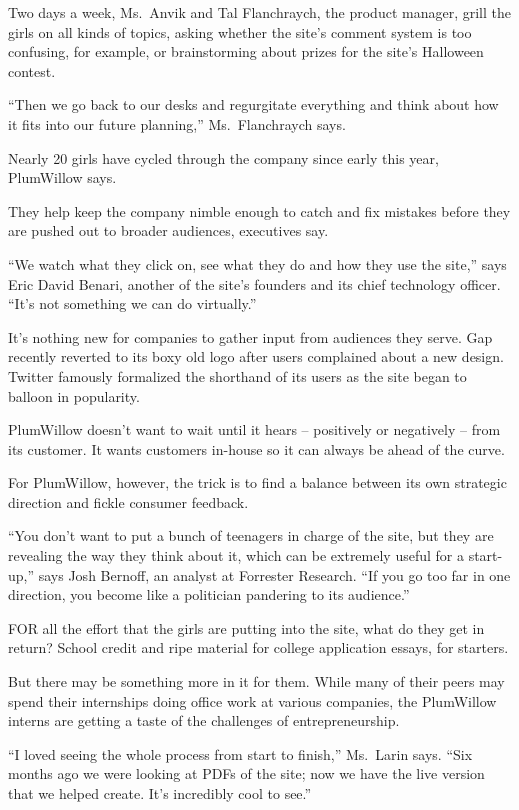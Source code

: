 ﻿\documentclass[12pt]{article}
\begin{document}
Two days a week, Ms.~Anvik and Tal Flanchraych, the product manager, grill the girls on all kinds of
topics, asking whether the site's comment system is too confusing, for example, or brainstorming
about prizes for the site's Halloween contest.

``Then we go back to our desks and regurgitate everything and think about how it fits into our
future planning,'' Ms.~Flanchraych says.

Nearly 20 girls have cycled through the company since early this year, PlumWillow says.

They help keep the company nimble enough to catch and fix mistakes before they are pushed out to
broader audiences, executives say.

``We watch what they click on, see what they do and how they use the site,'' says Eric David Benari,
another of the site's founders and its chief technology officer. ``It's not something we can do
virtually.''

It's nothing new for companies to gather input from audiences they serve. Gap recently reverted to
its boxy old logo after users complained about a new design. Twitter famously formalized the
shorthand of its users as the site began to balloon in popularity.

PlumWillow doesn't want to wait until it hears -- positively or negatively -- from its customer. It
wants customers in-house so it can always be ahead of the curve.

For PlumWillow, however, the trick is to find a balance between its own strategic direction and
fickle consumer feedback.

``You don't want to put a bunch of teenagers in charge of the site, but they are revealing the way
they think about it, which can be extremely useful for a start-up,'' says Josh Bernoff, an analyst
at Forrester Research. ``If you go too far in one direction, you become like a politician pandering
to its audience.''

FOR all the effort that the girls are putting into the site, what do they get in return? School
credit and ripe material for college application essays, for starters.

But there may be something more in it for them. While many of their peers may spend their
internships doing office work at various companies, the PlumWillow interns are getting a taste of
the challenges of entrepreneurship.

``I loved seeing the whole process from start to finish,'' Ms.~Larin says. ``Six months ago we were
looking at PDFs of the site; now we have the live version that we helped create. It's incredibly
cool to see.''
\end{document}
